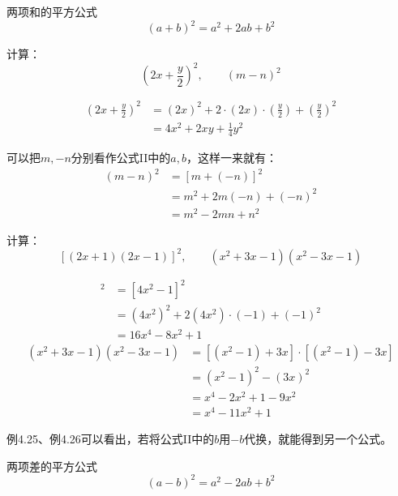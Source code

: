 \begin{blk}{两项和的平方公式}
    \begin{equation*}
        (a+b)^2=a^2+2ab+b^2\tag{II}
    \end{equation*}
\end{blk}

\begin{example}
    计算：
    \[\left(2x+\frac{y}{2}\right)^2,\qquad (m-n)^2  \]
\end{example}

\begin{solution}
\[\begin{split}
    \left(2x+\frac{y}{2}\right)^2&=(2x)^2+2\cdot (2x)\cdot \left(\frac{y}{2}\right)+\left(\frac{y}{2}\right)^2\\
    &=4x^2+2xy+\frac{1}{4}y^2
\end{split}\]

可以把$m,-n$分别看作公式II中的$a,b$，这样一来就有：
\[\begin{split}
    (m-n)^2&=[m+(-n)]^2\\
    &=m^2+2m(-n)+(-n)^2\\
    &=m^2-2mn+n^2
\end{split}\]

\end{solution}

\begin{example}
计算：
\[[(2x+1)(2x-1)]^2,\qquad (x^2+3x-1)(x^2-3x-1) \]
\end{example}

\begin{solution}
\begin{align*}
    [(2x+1)(2x-1)]^2&=[4x^2-1]^2 \tag{公式I}\\
    &=(4x^2)^2+2(4x^2)\cdot (-1)+(-1)^2 \tag{公式II}\\
    &=16x^4-8x^2+1
\end{align*}    
\begin{align*}
    (x^2+3x-1)(x^2-3x-1) &= [(x^2-1)+3x]\cdot [(x^2-1)-3x] \\
    &=(x^2-1)^2-(3x)^2\\
    &=x^4-2x^2+1-9x^2\\
    &=x^4-11x^2+1
\end{align*}  
\end{solution}

例4.25、例4.26可以看出，若将公式II中的$b$用$-b$代换，就能得到另一个公式。

\begin{blk}{两项差的平方公式}
\begin{equation*}
    (a-b)^2=a^2-2ab+b^2 \tag{III}
\end{equation*}    
\end{blk}

